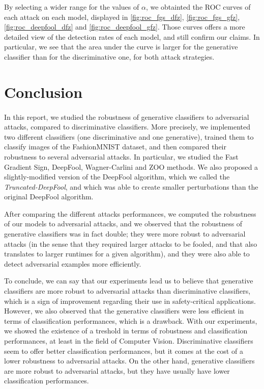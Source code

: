 \documentclass[11pt,twocolumn,letterpaper]{article}
\begin{document}
By selecting a wider range for the values of $\alpha$, we obtainted the ROC curves of each attack on each model, displayed in \cref{fig:roc_fgs_dfz}, \cref{fig:roc_fgs_gfz}, \cref{fig:roc_deepfool_dfz} and \cref{fig:roc_deepfool_gfz}. Those curves offers a more detailed view of the detection rates of each model, and still confirm our claims. In particular, we see that the area under the curve is larger for the generative classifier than for the discriminative one, for both attack strategies.


\section{Conclusion}
\label{sec:conclusion}

\paragraph{} In this report, we studied the robustness of generative classifiers to adversarial attacks, compared to discriminative classifiers. More precisely, we implemented two different classifiers (one discriminative and one generative), trained them to classify images of the FashionMNIST dataset, and then compared their robustness to several adversarial attacks. In particular, we studied the Fast Gradient Sign, DeepFool, Wagner-Carlini and ZOO methods. We also proposed a slightly-modified version of the DeepFool algorithm, which we called the \textit{Truncated-DeepFool}, and which was able to create smaller perturbations than the original DeepFool algorithm.

After comparing the different attacks performances, we computed the robustness of our models to adversarial attacks, and we observed that the robustness of generative classifiers was in fact double; they were more robust to adversarial attacks (in the sense that they required larger attacks to be fooled, and that also translates to larger runtimes for a given algorithm), and they were also able to detect adversarial examples more efficiently.

To conclude, we can say that our experiments lead us to believe that generative classifiers are more robust to adversarial attacks than discriminative classifiers, which is a sign of improvement regarding their use in safety-critical applications. However, we also observed that the generative classifiers were less efficient in terms of classification performances, which is a drawback. With our experiments, we showed the existence of a treshold in terms of robustness and classification performances, at least in the field of Computer Vision. Discriminative classifiers seem to offer better classification performances, but it comes at the cost of a lower robustness to adversarial attacks. On the other hand, generative classifiers are more robust to adversarial attacks, but they have usually have lower classification performances. 
\end{document}

